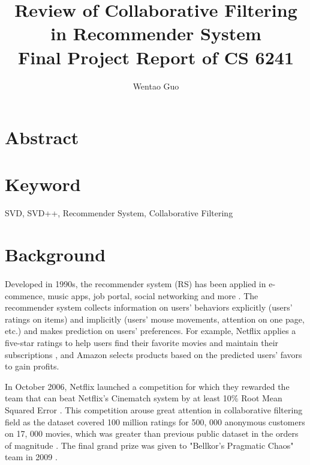 \documentclass[letter paper, 11pt]{article}
\begin{document}
	
	
	\title{%
		Review of Collaborative Filtering in Recommender System \\
		\large Final Project Report of CS 6241}
	
	\author{Wentao Guo}
	
	\date{}
	
	\maketitle
	
	
	\section*{Abstract}		
	
	\section*{Keyword}
	\begin{center}
	SVD, SVD++, Recommender System, Collaborative Filtering
	\end{center}

	
	\section{Background} 
	\paragraph{}
	Developed in 1990s, the recommender system (RS) has been applied in e-commence, music apps, job portal, social networking and more \cite{netflix}. The recommender system collects information on users' behaviors explicitly (users' ratings on items) and implicitly (users' mouse movements, attention on one page, etc.) and makes prediction on users' preferences. For example, Netflix applies a five-star ratings to help users find their favorite movies and maintain their subscriptions \cite{gower}, and Amazon selects products based on the predicted users' favors to gain profits. 
	
	
	In October 2006, Netflix launched a competition for which they rewarded the team that can beat Netflix's Cinematch system by at least 10\% Root Mean Squared Error \cite{gower}. This competition arouse great attention in collaborative filtering field as the dataset covered 100 million ratings for 500, 000 anonymous customers on 17, 000 movies, which was greater than previous public dataset in the orders of magnitude \cite{MFinRS}. The final grand prize was given to "Bellkor's Pragmatic Chaos" team in 2009 \cite{gower} \cite{koren}. 
	
\end{document}
